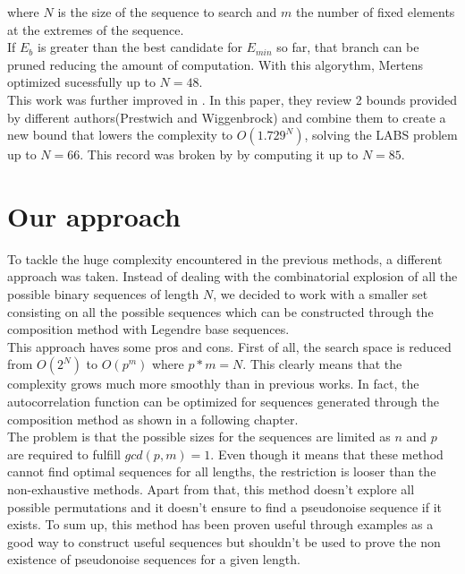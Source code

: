   where $N$ is the size of the sequence to search and $m$ the number of fixed
  elements at the extremes of the sequence.\\

  If $E_b$ is greater than the best candidate for $E_{min}$ so far, that branch
  can be pruned reducing the amount of computation. With this algorythm,
  Mertens optimized sucessfully up to $N = 48$.\\

  This work was further improved in \citet{Packebusch_2016}. In this paper,
  they review 2 bounds provided by different authors(Prestwich and
  Wiggenbrock) and combine them to create a new bound that lowers the
  complexity to $O(1.729^N)$, solving the LABS problem up to $N = 66$. This
  record was broken by \citet{anatoli} by computing it up to $N = 85$.\\

  \section{Our approach}

  To tackle the huge complexity encountered in the previous methods, a different
  approach was taken. Instead of dealing with the combinatorial explosion
  of all the possible binary sequences of length $N$, we decided to work with
  a smaller set consisting on all the possible sequences which can be
  constructed through the composition method with Legendre base sequences.\\

  This approach haves some pros and cons. First of all, the search space is
  reduced from $O(2^N)$ to $O(p^m)$ where $p*m = N$. This clearly means that
  the complexity grows much more smoothly than in previous works. In fact, the
  autocorrelation function can be optimized for sequences generated through the
  composition method as shown in a following chapter.\\

  The problem is that the possible sizes for the sequences are limited as $n$
  and $p$ are required to fulfill $gcd(p, m) = 1$. Even though it means that
  these method cannot find optimal sequences for all lengths, the restriction is
  looser than the non-exhaustive methods. Apart from that, this method doesn't
  explore all possible permutations and it doesn't ensure to find a pseudonoise
  sequence if it exists. To sum up, this method has been proven useful
  through examples as a good way to construct useful sequences but shouldn't
  be used to prove the non existence of pseudonoise sequences for a given
  length.\\

